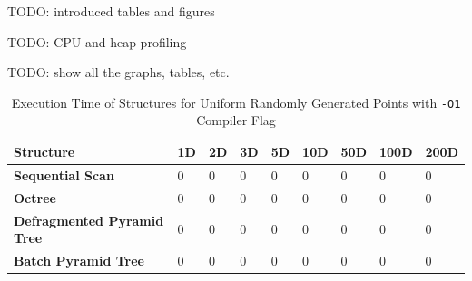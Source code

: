 TODO: introduced tables and figures

TODO: CPU and heap profiling

TODO: show all the graphs, tables, etc.

\begin{table}
	\centering
	\begin{tabular}{|l|l|l|l|l|l|l|l|l|}
		\hline
		\textbf{Structure} & \textbf{1D} & \textbf{2D} & \textbf{3D} & \textbf{5D} & \textbf{10D} & \textbf{50D} & \textbf{100D} & \textbf{200D} \\
		\hline
		\textbf{Sequential Scan} & 0 & 0 & 0 & 0 & 0 & 0 & 0 & 0 \\
		\textbf{Octree} & 0 & 0 & 0 & 0 & 0 & 0 & 0 & 0 \\
		\textbf{Defragmented Pyramid Tree} & 0 & 0 & 0 & 0 & 0 & 0 & 0 & 0 \\
		\textbf{Batch Pyramid Tree} & 0 & 0 & 0 & 0 & 0 & 0 & 0 & 0 \\
		\hline
	\end{tabular}
	\caption{Execution Time of Structures for Uniform Randomly Generated Points with \texttt{-O1} Compiler Flag}
	\label{tab:perf1-randuniform-o1}
\end{table}

